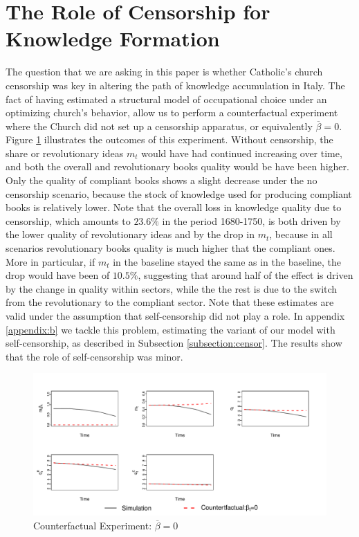 \documentclass[12pt]{article}
\begin{document}
\section{The Role of Censorship for Knowledge Formation}
The question that we are asking in this paper is whether Catholic's church censorship was key in altering the path of knowledge accumulation in Italy. The fact of having estimated a structural model of occupational choice under an optimizing church's behavior, allow us to perform a counterfactual experiment where the Church did not set up a censorship apparatus, or equivalently $\overline{\beta}=0$. Figure \ref{fig:exp} illustrates the outcomes of this experiment. Without censorship, the share or revolutionary ideas $m_t$ would have had continued increasing over time, and both the overall and revolutionary books quality would be have been higher.  Only the quality of compliant books shows a slight decrease under the no censorship scenario, because the stock of knowledge used for producing compliant books is relatively lower. Note that the overall loss in knowledge quality due to censorship, which amounts to $23.6\%$ in the period 1680-1750, is both driven by the lower quality of revolutionary ideas and by the drop in $m_t$, because in all scenarios  revolutionary books quality is much higher that the compliant ones. More in particular, if $m_t$ in the baseline stayed the same as in the baseline, the drop would have been of $10.5\%$, suggesting that around half of the effect is driven by the change in quality within sectors, while the the rest is due to the switch from the revolutionary to the compliant sector. Note that these estimates are valid under the assumption that self-censorship did not play a role. In appendix \ref{appendix:b} we tackle this problem, estimating the variant of our model with self-censorship, as described in Subsection \ref{subsection:censor}. The results show that the role of self-censorship was minor.
\begin{figure}[htbp]
\includegraphics[width=.99\textwidth]{dynamics.pdf}
\caption{Counterfactual Experiment: $\overline{\beta}=0$}
\label{fig:exp}
\end{figure}
\end{document}
